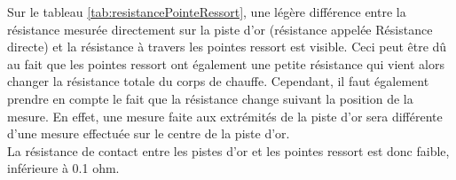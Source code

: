 Sur le tableau \ref{tab:resistancePointeRessort}, une légère différence entre la résistance mesurée directement sur la piste d'or (résistance 
appelée Résistance directe) et la résistance à travers les pointes ressort est visible. Ceci peut être dû au fait que les pointes ressort ont 
également une petite résistance qui vient alors changer la résistance totale du corps de chauffe. Cependant, il faut également prendre en 
compte le fait que la résistance change suivant la position de la mesure. En effet, une mesure faite aux extrémités de la piste d'or sera différente 
d'une mesure effectuée sur le centre de la piste d'or. \\

La résistance de contact entre les pistes d'or et les pointes ressort est donc faible, inférieure à 0.1 ohm.

